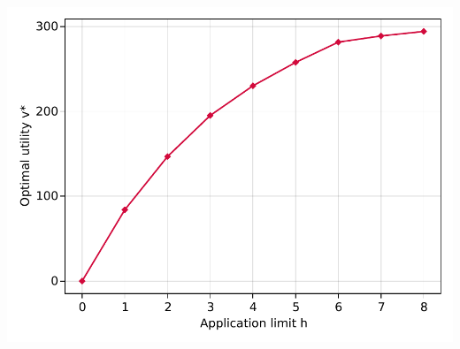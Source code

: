 \documentclass[11pt,mathserif,notheorems]{beamer}
\theoremstyle{definition}
\theoremstyle{definition}
\begin{document}
\begin{frame}[plain]
\begin{center}
 \includegraphics[height=\textheight]{./plots/h_v-example.pdf}
\end{center}
\end{frame}
\end{document}
